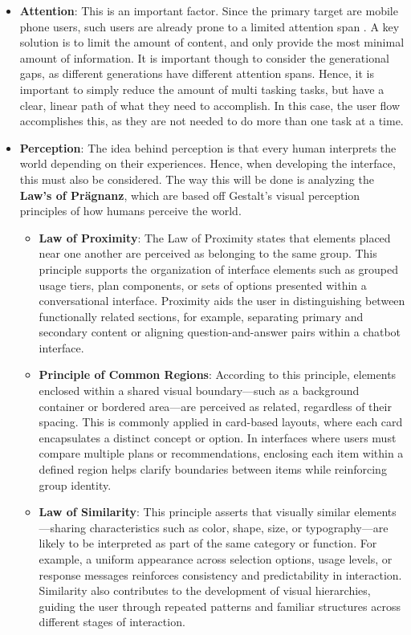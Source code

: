 \documentclass[conference]{IEEEtran}
\begin{document}
\begin{itemize}
\begin{itemize}
    \end{itemize}
    \item \textbf{Attention}: This is an important factor. Since the primary target are mobile phone users, such users are already prone to a limited attention span \cite{Ward2017}. A key solution is to limit the amount of content, and only provide the most minimal amount of information. It is important though to consider the generational gaps, as different generations have different attention spans. Hence, it is important to simply reduce the amount of multi tasking tasks, but have a clear, linear path of what they need to accomplish\cite{Carrier2009MultitaskingAG}. In this case, the user flow accomplishes this, as they are not needed to do more than one task at a time.
    \item \textbf{Perception}:
    The idea behind perception is that every human interprets the world depending on their experiences. Hence, when developing the interface, this must also be considered. The way this will be done is analyzing the \textbf{Law's of Prägnanz}, which are based off Gestalt's visual perception principles of how humans perceive the world. 
    \begin{itemize}
        \item \textbf{Law of Proximity}: The Law of Proximity states that elements placed near one another are perceived as belonging to the same group. This principle supports the organization of interface elements such as grouped usage tiers, plan components, or sets of options presented within a conversational interface. Proximity aids the user in distinguishing between functionally related sections, for example, separating primary and secondary content or aligning question-and-answer pairs within a chatbot interface.
        \item \textbf{Principle of Common Regions}: According to this principle, elements enclosed within a shared visual boundary—such as a background container or bordered area—are perceived as related, regardless of their spacing. This is commonly applied in card-based layouts, where each card encapsulates a distinct concept or option. In interfaces where users must compare multiple plans or recommendations, enclosing each item within a defined region helps clarify boundaries between items while reinforcing group identity.
        \item \textbf{Law of Similarity}: This principle asserts that visually similar elements—sharing characteristics such as color, shape, size, or typography—are likely to be interpreted as part of the same category or function. For example, a uniform appearance across selection options, usage levels, or response messages reinforces consistency and predictability in interaction. Similarity also contributes to the development of visual hierarchies, guiding the user through repeated patterns and familiar structures across different stages of interaction.

\end{itemize}
\end{itemize}
\end{document}

